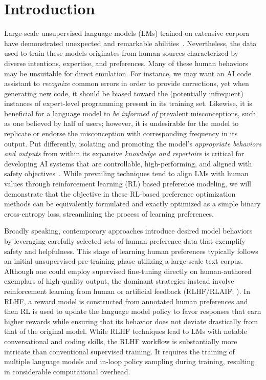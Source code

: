 \section{Introduction}
Large-scale unsupervised language models (LMs) trained on extensive corpora have demonstrated unexpected and remarkable abilities~\citep{chowdhery2022palm, brown2020language, touvron2023llama, bubeck2023sparks}. Nevertheless, the data used to train these models originates from human sources characterized by diverse intentions, expertise, and preferences. Many of these human behaviors may be unsuitable for direct emulation. For instance, we may want an AI code assistant to \textit{recognize} common errors in order to provide corrections, yet when generating new code, it should be biased toward the (potentially infrequent) instances of expert-level programming present in its training set. Likewise, it is beneficial for a language model to \textit{be informed of} prevalent misconceptions, such as one believed by half of users; however, it is undesirable for the model to replicate or endorse the misconception with corresponding frequency in its output. Put differently, isolating and promoting the model's \emph{appropriate behaviors and outputs} from within its expansive \textit{knowledge and repertoire} is critical for developing AI systems that are controllable, high-performing, and aligned with safety objectives~\citep{ouyang2022training}. While prevailing techniques tend to align LMs with human values through reinforcement learning (RL) based preference modeling, we will demonstrate that the objective in these RL-based preference optimization methods can be equivalently formulated and exactly optimized as a simple binary cross-entropy loss, streamlining the process of learning preferences.

Broadly speaking, contemporary approaches introduce desired model behaviors by leveraging carefully selected sets of human preference data that exemplify safety and helpfulness. This stage of learning human preferences typically follows an initial unsupervised pre-training phase utilizing a large-scale text corpus. Although one could employ supervised fine-tuning directly on human-authored exemplars of high-quality output, the dominant strategies instead involve reinforcement learning from human or artificial feedback (RLHF/RLAIF; \citep{christiano2017deep, bai2022constitutional}). In RLHF, a reward model is constructed from annotated human preferences and then RL is used to update the language model policy to favor responses that earn higher rewards while ensuring that its behavior does not deviate drastically from that of the original model. While RLHF techniques lead to LMs with notable conversational and coding skills, the RLHF workflow is substantially more intricate than conventional supervised training. It requires the training of multiple language models and in-loop policy sampling during training, resulting in considerable computational overhead.

